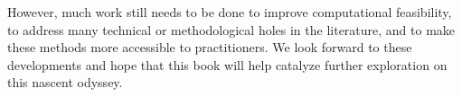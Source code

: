 However, much work still needs to be done to improve computational
feasibility, to address many technical or methodological holes in the
literature, and to make these methods more accessible to
practitioners.  We look forward to these developments and hope that
this book will help catalyze further exploration on this nascent
odyssey.













